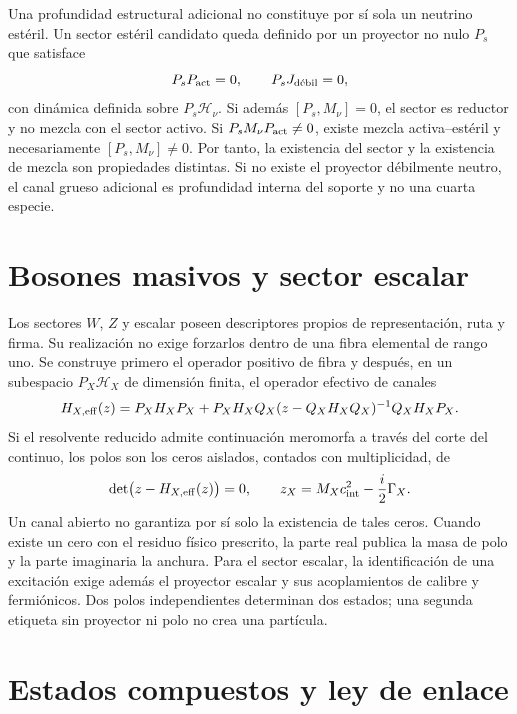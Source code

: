 Una profundidad estructural adicional no constituye por sí sola un neutrino
estéril. Un sector estéril candidato queda definido por un proyector no nulo
\(P_s\) que satisface
\[
 P_s P_{\rm act}=0,
 \qquad P_s J_{\text{débil}}=0,
\]
con dinámica definida sobre \(P_s\mathcal H_\nu\). Si además
\([P_s,M_\nu]=0\), el sector es reductor y no mezcla con el sector activo. Si
\(P_sM_\nu P_{\rm act}\ne0\), existe mezcla activa--estéril y necesariamente
\([P_s,M_\nu]\ne0\). Por tanto, la existencia del sector y la existencia de
mezcla son propiedades distintas. Si no existe el proyector débilmente neutro,
el canal grueso adicional es profundidad interna del soporte y no una cuarta
especie.

\section{Bosones masivos y sector escalar}

Los sectores \(W\), \(Z\) y escalar poseen descriptores propios de
representación, ruta y firma. Su realización no exige forzarlos dentro de una
fibra elemental de rango uno. Se construye primero el operador positivo de
fibra y después, en un subespacio \(P_X\mathcal H_X\) de dimensión finita, el
operador efectivo de canales
\[
 H_{X,\rm eff}(z)
 =P_X H_X P_X
 +P_X H_X Q_X(z-Q_X H_X Q_X)^{-1}Q_X H_X P_X.
\]
Si el resolvente reducido admite continuación meromorfa a través del corte del
continuo, los polos son los ceros aislados, contados con multiplicidad, de
\[
 \det\bigl(z-H_{X,\rm eff}(z)\bigr)=0,
 \qquad
 z_X=M_X c_{\rm int}^2-\frac{i}{2}\Gamma_X.
\]
Un canal abierto no garantiza por sí solo la existencia de tales ceros. Cuando
existe un cero con el residuo físico prescrito, la parte real publica la masa de
polo y la parte imaginaria la anchura. Para el
sector escalar, la identificación de una excitación exige además el proyector
escalar y sus acoplamientos de calibre y fermiónicos. Dos polos independientes
determinan dos estados; una segunda etiqueta sin proyector ni polo no crea una
partícula.

\section{Estados compuestos y ley de enlace}


